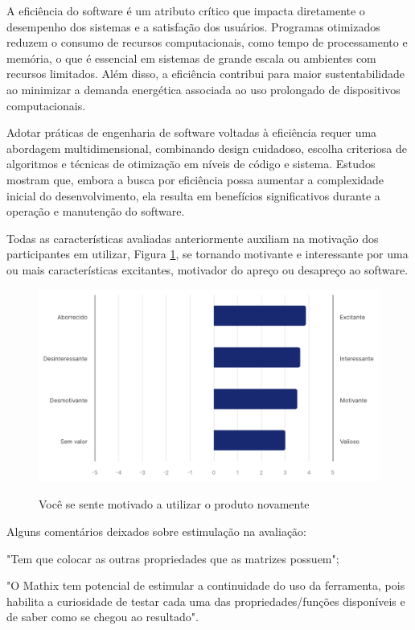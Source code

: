 \begin{citacao}
A eficiência do software é um atributo crítico que impacta diretamente o desempenho dos sistemas e a satisfação dos usuários. Programas otimizados reduzem o consumo de recursos computacionais, como tempo de processamento e memória, o que é essencial em sistemas de grande escala ou ambientes com recursos limitados. Além disso, a eficiência contribui para maior sustentabilidade ao minimizar a demanda energética associada ao uso prolongado de dispositivos computacionais.

Adotar práticas de engenharia de software voltadas à eficiência requer uma abordagem multidimensional, combinando design cuidadoso, escolha criteriosa de algoritmos e técnicas de otimização em níveis de código e sistema. Estudos mostram que, embora a busca por eficiência possa aumentar a complexidade inicial do desenvolvimento, ela resulta em benefícios significativos durante a operação e manutenção do software.
\end{citacao}

Todas as características avaliadas anteriormente auxiliam na motivação dos participantes em utilizar, Figura \ref{fig:ux-7}, se tornando motivante e interessante por uma ou mais características excitantes, motivador do apreço ou desapreço ao software.

\begin{figure}[h!]
    \caption{Você se sente motivado a utilizar o produto novamente}
    \centering
    \includegraphics[scale=0.4]{figuras/resultados/ux-7.png}
    \label{fig:ux-7}
\end{figure}


Alguns comentários deixados sobre estimulação na avaliação:
\begin{citacao}
\item "Tem que colocar as outras propriedades que as matrizes possuem";
\item "O Mathix tem potencial de estimular a continuidade do uso da ferramenta, pois habilita a curiosidade de testar cada uma das propriedades/funções disponíveis e de saber como se chegou ao resultado".
\end{citacao}


